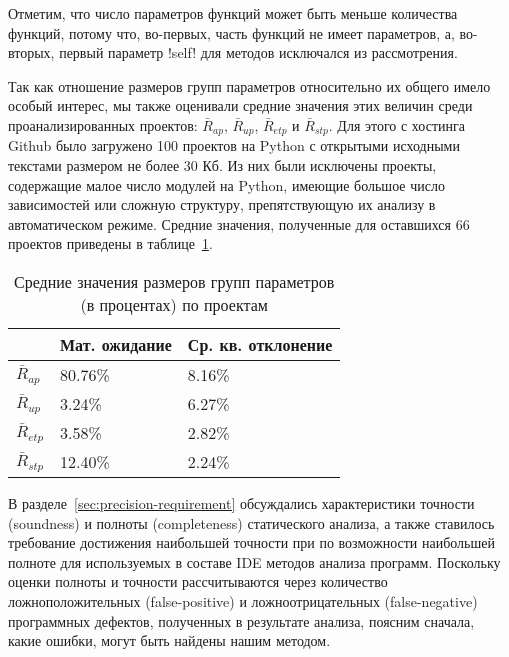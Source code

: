 Отметим, что число параметров функций может быть меньше количества функций,
потому что, во-первых, часть функций не имеет параметров, а, во-вторых, первый
параметр !self! для методов исключался из рассмотрения.

Так как отношение размеров групп параметров относительно их общего имело
особый интерес, мы также оценивали средние значения этих величин среди
проанализированных проектов: $\bar{R}_{ap}$, $\bar{R}_{up}$, $\bar{R}_{etp}$ и
$\bar{R}_{stp}$. Для этого с хостинга Github было загружено 100 проектов на
Python с открытыми исходными текстами размером не более 30 Кб. Из них были исключены
проекты, содержащие малое число модулей на Python, имеющие большое число
зависимостей или сложную структуру, препятствующую их анализу в автоматическом
режиме. Средние значения, полученные для оставшихся 66 проектов приведены в
таблице~\ref{tab:statistics-results-2}.

\begin{table}[H]
  \small
  \caption{Средние значения размеров групп параметров (в процентах) по проектам}
  \label{tab:statistics-results-2}
  \begin{tabularx}{\textwidth}{ |X|X|X| }
    \hline
    & Мат. ожидание & Ср. кв. отклонение 
    \\ \hline

    $\bar{R}_{ap}$ & 80.76\% & 8.16\% 
    \\ \hline

    $\bar{R}_{up}$ & 3.24\% & 6.27\% 
    \\ \hline

    $\bar{R}_{etp}$ & 3.58\% & 2.82\%
    \\ \hline

    $\bar{R}_{stp}$ & 12.40\% & 2.24\% 
    \\ \hline

  \end{tabularx}
\end{table}

В разделе~\ref{sec:precision-requirement} обсуждались характеристики точности
(soundness) и полноты (completeness) статического анализа, а также ставилось
требование достижения наибольшей точности при по возможности наибольшей полноте
для используемых в составе IDE методов анализа программ. Поскольку оценки
полноты и точности рассчитываются через количество ложноположительных
(false-positive) и ложноотрицательных (false-negative) программных дефектов,
полученных в результате анализа, поясним сначала, какие ошибки, могут быть найдены
нашим методом.

